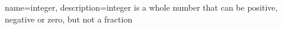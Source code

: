{
    name=integer,
    description={integer is a whole number that can be positive, negative or zero, but not a fraction}
}

